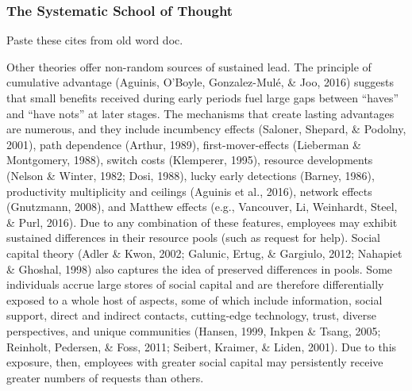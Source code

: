 \documentclass[english,,man]{apa6}
\begin{document}
\hypertarget{the-systematic-school-of-thought}{%
\subsubsection{The Systematic School of Thought}\label{the-systematic-school-of-thought}}

Paste these cites from old word doc.

Other theories offer non-random sources of sustained lead. The principle of cumulative advantage (Aguinis, O'Boyle, Gonzalez-Mulé, \& Joo, 2016) suggests that small benefits received during early periods fuel large gaps between \enquote{haves} and \enquote{have nots} at later stages. The mechanisms that create lasting advantages are numerous, and they include incumbency effects (Saloner, Shepard, \& Podolny, 2001), path dependence (Arthur, 1989), first-mover-effects (Lieberman \& Montgomery, 1988), switch costs (Klemperer, 1995), resource developments (Nelson \& Winter, 1982; Dosi, 1988), lucky early detections (Barney, 1986), productivity multiplicity and ceilings (Aguinis et al., 2016), network effects (Gnutzmann, 2008), and Matthew effects (e.g., Vancouver, Li, Weinhardt, Steel, \& Purl, 2016). Due to any combination of these features, employees may exhibit sustained differences in their resource pools (such as request for help). Social capital theory (Adler \& Kwon, 2002; Galunic, Ertug, \& Gargiulo, 2012; Nahapiet \& Ghoshal, 1998) also captures the idea of preserved differences in pools. Some individuals accrue large stores of social capital and are therefore differentially exposed to a whole host of aspects, some of which include information, social support, direct and indirect contacts, cutting-edge technology, trust, diverse perspectives, and unique communities (Hansen, 1999, Inkpen \& Tsang, 2005; Reinholt, Pedersen, \& Foss, 2011; Seibert, Kraimer, \& Liden, 2001). Due to this exposure, then, employees with greater social capital may persistently receive greater numbers of requests than others.
\end{document}

